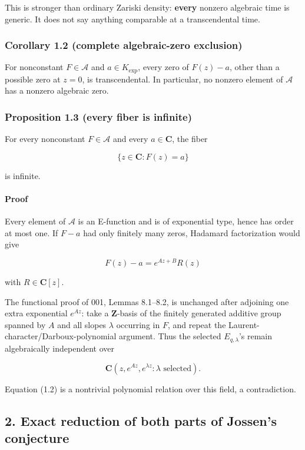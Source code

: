 \documentclass[11pt]{article}
\theoremstyle{keio}
\theoremstyle{definition}
\theoremstyle{remark}
\begin{document}
This is stronger than ordinary Zariski density: \textbf{every} nonzero algebraic
time is generic. It does not say anything comparable at a transcendental
time.

\subsubsection{Corollary 1.2 (complete algebraic-zero exclusion)}

For nonconstant \(F\in\mathscr A\) and \(a\in K_{\exp}\), every zero of
\(F(z)-a\), other than a possible zero at \(z=0\), is transcendental.
In particular, no nonzero element of \(\mathscr A\) has a nonzero algebraic
zero.

\subsubsection{Proposition 1.3 (every fiber is infinite)}

For every nonconstant \(F\in\mathscr A\) and every \(a\in\mathbf C\), the
fiber

\[
  \{z\in\mathbf C:F(z)=a\}
\]

is infinite.

\paragraph{Proof}

Every element of \(\mathscr A\) is an E-function and is of exponential type,
hence has order at most one. If \(F-a\) had only finitely many zeros,
Hadamard factorization would give

\[
  F(z)-a=e^{Az+B}R(z)                                      \tag{J-1.2}
\]

with \(R\in\mathbf C[z]\).

The functional proof of 001, Lemmas 8.1--8.2, is unchanged after adjoining
one extra exponential \(e^{Az}\): take a \(\mathbf Z\)-basis of the finitely
generated additive group spanned by \(A\) and all slopes \(\lambda\) occurring
in \(F\), and repeat the Laurent-character/Darboux-polynomial argument.
Thus the selected \(E_{q,\lambda}\)'s remain algebraically independent over

\[
  \mathbf C(z,e^{Az},e^{\lambda z}:\lambda\text{ selected}).
\]

Equation (1.2) is a nontrivial polynomial relation over this field, a
contradiction.

\subsection{2. Exact reduction of both parts of Jossen's conjecture}
\end{document}
